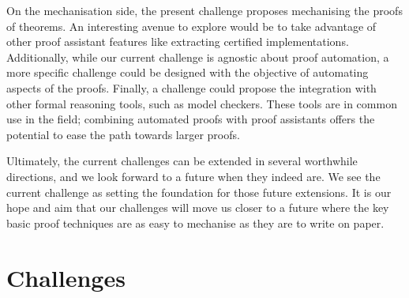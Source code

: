 \documentclass[runningheads]{llncs}
\begin{document}
On the mechanisation side, the present challenge proposes mechanising the proofs of theorems.
An interesting avenue to explore would be to take advantage of other proof assistant features like extracting certified implementations.
Additionally, while our current challenge is agnostic about proof automation, a more specific challenge could be designed with the objective of automating aspects of the proofs.
Finally, a challenge could propose the integration with other formal reasoning tools, such as model checkers.
These tools are in common use in the field; combining automated proofs with proof assistants offers the potential to ease the path towards larger proofs.

Ultimately, the current challenges can be extended in several worthwhile directions, and we look forward to a future when they indeed are.
We see the current challenge as setting the foundation for those future extensions.
It is our hope and aim that our challenges will move us closer to a future where the key basic proof techniques are as easy to mechanise as they are to write on paper.




\clearpage
\appendix
\section{Challenges}\label{app:challenges}

\end{document}
